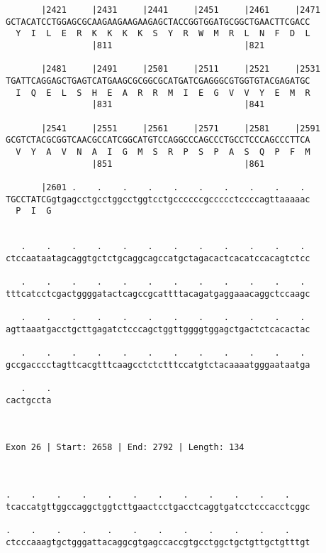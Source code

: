 \documentclass{article}
\begin{document}
\begin{Verbatim}
       |2421     |2431     |2441     |2451     |2461     |2471
GCTACATCCTGGAGCGCAAGAAGAAGAAGAGCTACCGGTGGATGCGGCTGAACTTCGACC
  Y  I  L  E  R  K  K  K  K  S  Y  R  W  M  R  L  N  F  D  L
                 |811                          |821         
  
       |2481     |2491     |2501     |2511     |2521     |2531
TGATTCAGGAGCTGAGTCATGAAGCGCGGCGCATGATCGAGGGCGTGGTGTACGAGATGC
  I  Q  E  L  S  H  E  A  R  R  M  I  E  G  V  V  Y  E  M  R
                 |831                          |841         
  
       |2541     |2551     |2561     |2571     |2581     |2591
GCGTCTACGCGGTCAACGCCATCGGCATGTCCAGGCCCAGCCCTGCCTCCCAGCCCTTCA
  V  Y  A  V  N  A  I  G  M  S  R  P  S  P  A  S  Q  P  F  M
                 |851                          |861         
  
       |2601 .    .    .    .    .    .    .    .    .    . 
TGCCTATCGgtgagcctgcctggcctggtcctgccccccgccccctccccagttaaaaac
  P  I  G                                                   
                                                            
  
   .    .    .    .    .    .    .    .    .    .    .    . 
ctccaataatagcaggtgctctgcaggcagccatgctagacactcacatccacagtctcc
                                                            
   .    .    .    .    .    .    .    .    .    .    .    . 
tttcatcctcgactggggatactcagccgcattttacagatgaggaaacaggctccaagc
                                                            
   .    .    .    .    .    .    .    .    .    .    .    . 
agttaaatgacctgcttgagatctcccagctggttggggtggagctgactctcacactac
                                                            
   .    .    .    .    .    .    .    .    .    .    .    . 
gccgacccctagttcacgtttcaagcctctctttccatgtctacaaaatgggaataatga
                                                            
   .    .
cactgccta
         
         
 
Exon 26 | Start: 2658 | End: 2792 | Length: 134



.    .    .    .    .    .    .    .    .    .    .    .    
tcaccatgttggccaggctggtcttgaactcctgacctcaggtgatcctcccacctcggc
                                                            
.    .    .    .    .    .    .    .    .    .    .    .    
ctcccaaagtgctgggattacaggcgtgagccaccgtgcctggctgctgttgctgtttgt
                                                            

\end{Verbatim}
\end{document}

